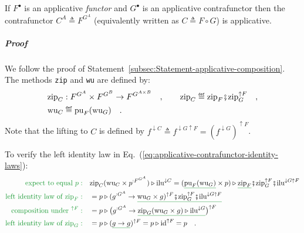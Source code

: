 If $F^{\bullet}$ is an applicative \emph{functor} and $G^{\bullet}$
is an applicative contrafunctor then the contrafunctor $C^{A}\triangleq F^{G^{A}}$
(equivalently written as $C\triangleq F\circ G$) is applicative.

\subparagraph{Proof}

We follow the proof of Statement~\ref{subsec:Statement-applicative-composition}.
The methods \lstinline!zip! and \lstinline!wu! are defined by:
\begin{align*}
 & \text{zip}_{C}:F^{G^{A}}\times F^{G^{B}}\rightarrow F^{G^{A\times B}}\quad,\quad\quad\text{zip}_{C}\triangleq\text{zip}_{F}\bef\text{zip}_{G}^{\uparrow F}\quad,\\
 & \text{wu}_{C}\triangleq\text{pu}_{F}(\text{wu}_{G})\quad.
\end{align*}
Note that the lifting to $C$ is defined by $f^{\downarrow C}\triangleq f^{\downarrow G\uparrow F}=(f^{\downarrow G})^{\uparrow F}$. 

To verify the left identity law in Eq.~(\ref{eq:applicative-contrafunctor-identity-laws}):
\begin{align*}
{\color{greenunder}\text{expect to equal }p:}\quad & \text{zip}_{C}(\text{wu}_{C}\times p^{:F^{G^{A}}})\triangleright\text{ilu}^{\downarrow C}=(\gunderline{\text{pu}_{F}(\text{wu}_{G})}\times p)\triangleright\gunderline{\text{zip}_{F}}\bef\text{zip}_{G}^{\uparrow F}\bef\text{ilu}^{\downarrow G\uparrow F}\\
{\color{greenunder}\text{left identity law of }\text{zip}_{F}:}\quad & =p\triangleright(g^{:G^{A}}\rightarrow\gunderline{\text{wu}_{G}\times g)^{\uparrow F}\bef\text{zip}_{G}^{\uparrow F}\bef\text{ilu}^{\downarrow G\uparrow F}}\\
{\color{greenunder}\text{composition under }^{\uparrow F}:}\quad & =p\triangleright\big(g^{:G^{A}}\rightarrow\gunderline{\text{zip}_{G}(\text{wu}_{G}\times g)\triangleright\text{ilu}^{\downarrow G}}\big)^{\uparrow F}\\
{\color{greenunder}\text{left identity law of }\text{zip}_{G}:}\quad & =p\triangleright(\gunderline{g\rightarrow g})^{\uparrow F}=p\triangleright\text{id}^{\uparrow F}=p\quad.
\end{align*}

